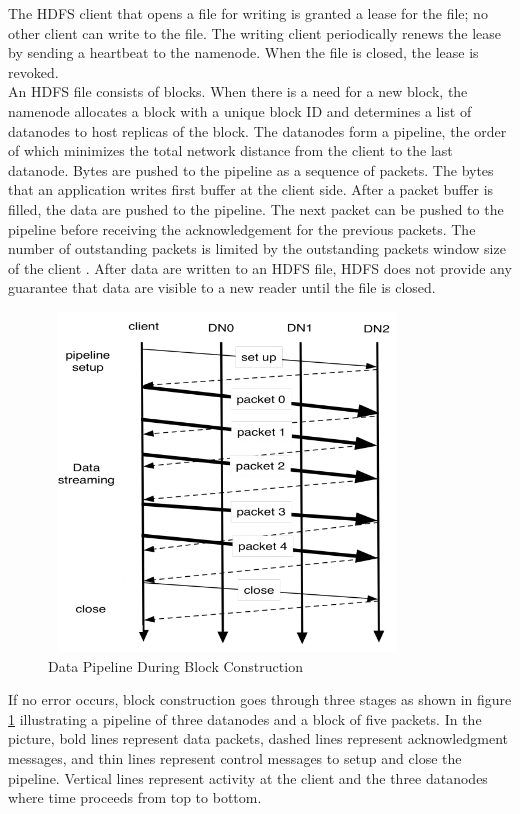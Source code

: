 The HDFS client that opens a file for writing is granted a lease for the file; no other client can write to the file. The writing client periodically renews the lease by sending a heartbeat to the namenode. When the file is closed, the lease is revoked. \\

An HDFS file consists of blocks. When there is a need for a new block, the namenode allocates a block with a unique block ID and determines a list of datanodes to host replicas of the block. The datanodes form a pipeline, the order of which minimizes the total network distance from the client to the last datanode. Bytes are pushed to the pipeline as a sequence of packets. The bytes that an application writes first buffer at the client side. After a packet buffer is filled, the data are pushed to the pipeline. The next packet can be pushed to the pipeline before receiving the acknowledgement for the previous packets. The number of outstanding packets is limited by the outstanding packets window size of the client \cite{cite23}. After data are written to an HDFS file, HDFS does not provide any guarantee that data are visible to a new reader until the file is closed.

\begin{figure}[!h]
\begin{center}
\includegraphics[width=9.5cm,height=9cm]{chapter2prime/pipeline.png}
\end{center}
\caption{Data Pipeline During Block Construction}
\label{pipline}
\end{figure}

If no error occurs, block construction goes through three stages as shown in figure \ref{pipline} illustrating a pipeline of three datanodes and a block of five packets. In the picture, bold lines represent data packets, dashed lines represent acknowledgment messages, and thin lines represent control messages to setup and close the pipeline. Vertical lines represent
activity at the client and the three datanodes where time proceeds from top to bottom.\\

